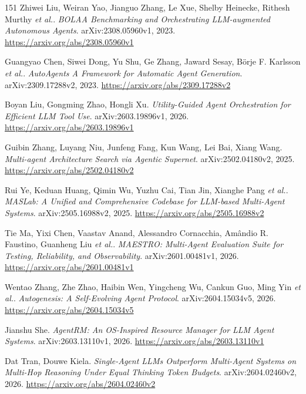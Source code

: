 \documentclass[11pt,a4paper]{article}
\begin{document}
\begin{thebibliography}{151}
Zhiwei Liu, Weiran Yao, Jianguo Zhang, Le Xue, Shelby Heinecke, Rithesh Murthy \emph{et al.}.
\newblock \emph{BOLAA Benchmarking and Orchestrating LLM-augmented Autonomous Agents}.
\newblock arXiv:2308.05960v1, 2023.
\newblock \url{https://arxiv.org/abs/2308.05960v1}

Guangyao Chen, Siwei Dong, Yu Shu, Ge Zhang, Jaward Sesay, B\"{o}rje F. Karlsson \emph{et al.}.
\newblock \emph{AutoAgents A Framework for Automatic Agent Generation}.
\newblock arXiv:2309.17288v2, 2023.
\newblock \url{https://arxiv.org/abs/2309.17288v2}

Boyan Liu, Gongming Zhao, Hongli Xu.
\newblock \emph{Utility-Guided Agent Orchestration for Efficient LLM Tool Use}.
\newblock arXiv:2603.19896v1, 2026.
\newblock \url{https://arxiv.org/abs/2603.19896v1}

Guibin Zhang, Luyang Niu, Junfeng Fang, Kun Wang, Lei Bai, Xiang Wang.
\newblock \emph{Multi-agent Architecture Search via Agentic Supernet}.
\newblock arXiv:2502.04180v2, 2025.
\newblock \url{https://arxiv.org/abs/2502.04180v2}

Rui Ye, Keduan Huang, Qimin Wu, Yuzhu Cai, Tian Jin, Xianghe Pang \emph{et al.}.
\newblock \emph{MASLab: A Unified and Comprehensive Codebase for LLM-based Multi-Agent Systems}.
\newblock arXiv:2505.16988v2, 2025.
\newblock \url{https://arxiv.org/abs/2505.16988v2}

Tie Ma, Yixi Chen, Vaastav Anand, Alessandro Cornacchia, Am\^{a}ndio R. Faustino, Guanheng Liu \emph{et al.}.
\newblock \emph{MAESTRO: Multi-Agent Evaluation Suite for Testing, Reliability, and Observability}.
\newblock arXiv:2601.00481v1, 2026.
\newblock \url{https://arxiv.org/abs/2601.00481v1}

Wentao Zhang, Zhe Zhao, Haibin Wen, Yingcheng Wu, Cankun Guo, Ming Yin \emph{et al.}.
\newblock \emph{Autogenesis: A Self-Evolving Agent Protocol}.
\newblock arXiv:2604.15034v5, 2026.
\newblock \url{https://arxiv.org/abs/2604.15034v5}

Jianshu She.
\newblock \emph{AgentRM: An OS-Inspired Resource Manager for LLM Agent Systems}.
\newblock arXiv:2603.13110v1, 2026.
\newblock \url{https://arxiv.org/abs/2603.13110v1}

Dat Tran, Douwe Kiela.
\newblock \emph{Single-Agent LLMs Outperform Multi-Agent Systems on Multi-Hop Reasoning Under Equal Thinking Token Budgets}.
\newblock arXiv:2604.02460v2, 2026.
\newblock \url{https://arxiv.org/abs/2604.02460v2}


\end{thebibliography}
\end{document}
